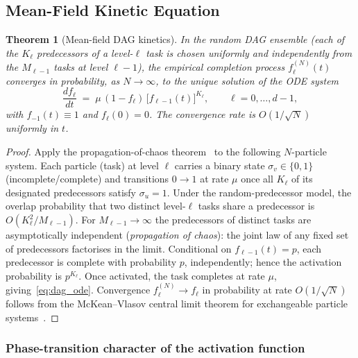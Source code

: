 \documentclass[11pt,a4paper]{report}
\newtheorem{theorem}{Theorem}[section]
\begin{document}
\subsection{Mean-Field Kinetic Equation}

\begin{theorem}[Mean-field DAG kinetics]\label{thm:dag_ode}
In the random DAG ensemble (each of the $K_\ell$ predecessors of a level-$\ell$
task is chosen uniformly and independently from the $M_{\ell-1}$ tasks at
level $\ell{-}1$), the empirical completion process $f_\ell^{(N)}(t)$
converges in probability, as $N \to \infty$, to the unique solution of the ODE
system
\begin{equation}\label{eq:dag_ode}
  \frac{d f_\ell}{dt}
  \;=\; \mu\,(1 - f_\ell)\,\bigl[f_{\ell-1}(t)\bigr]^{K_\ell},
  \qquad \ell = 0, \ldots, d-1,
\end{equation}
with $f_{-1}(t) \equiv 1$ and $f_\ell(0) = 0$.
The convergence rate is $O(1/\sqrt{N})$ uniformly in $t$.
\end{theorem}

\begin{proof}
Apply the propagation-of-chaos theorem~\cite{sznitman1991} to the following
$N$-particle system.
Each particle (task) at level $\ell$ carries a binary state
$\sigma_v \in \{0,1\}$ (incomplete/complete) and transitions $0 \to 1$
at rate $\mu$ once all $K_\ell$ of its designated predecessors satisfy
$\sigma_u = 1$.
Under the random-predecessor model, the overlap probability that two distinct
level-$\ell$ tasks share a predecessor is $O(K_\ell^2 / M_{\ell-1})$.
For $M_{\ell-1} \to \infty$ the predecessors of distinct tasks are
asymptotically independent (\emph{propagation of chaos}):
the joint law of any fixed set of predecessors factorises in the limit.
Conditional on $f_{\ell-1}(t) = p$, each predecessor is complete with
probability $p$, independently; hence the activation probability is $p^{K_\ell}$.
Once activated, the task completes at rate $\mu$, giving~\eqref{eq:dag_ode}.
Convergence $f_\ell^{(N)} \to f_\ell$ in probability at rate $O(1/\sqrt{N})$
follows from the McKean--Vlasov central limit theorem for exchangeable particle
systems~\cite{sznitman1991}.
\end{proof}

\subsubsection{Phase-transition character of the activation function}
\end{document}
